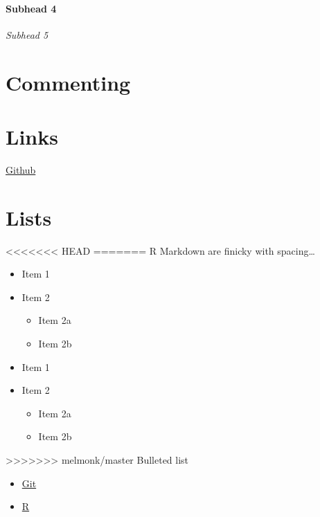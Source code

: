 \documentclass[12pt,]{article}
\providecommand{\tightlist}{%
  \setlength{\itemsep}{0pt}\setlength{\parskip}{0pt}}
\let\oldparagraph\paragraph
\renewcommand{\paragraph}[1]{\oldparagraph{#1}\mbox{}}
\begin{document}
\paragraph{Subhead 4}\label{subhead-4}

\emph{Subhead 5}

\section{Commenting}\label{commenting}

\section{Links}\label{links}

\href{www.github.com}{Github}

\section{Lists}\label{lists}

<<<<<<< HEAD
=======
R Markdown are finicky with spacing\ldots{}

\begin{itemize}
\tightlist
\item
  Item 1
\item
  Item 2

  \begin{itemize}
  \tightlist
  \item
    Item 2a
  \item
    Item 2b
  \end{itemize}
\item
  Item 1
\item
  Item 2

  \begin{itemize}
  \tightlist
  \item
    Item 2a
  \item
    Item 2b
  \end{itemize}
\end{itemize}

>>>>>>> melmonk/master
Bulleted list

\begin{itemize}[noitemsep,nolistsep,topsep=0pt]

\item \href{https://git-scm.com/book/en/v2/Getting-Started-Installing-Git}{Git}

\item \href{https://cran.r-project.org/bin/windows/base/}{R}

\end{itemize}
\end{document}
